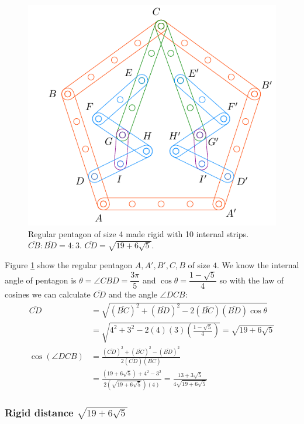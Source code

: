 \documentclass[11pt]{article}
\begin{document}
\begin{figure}[H]
\centering
\includegraphics[scale=1.1]{4/penta4-10a}
\caption{Regular pentagon of size 4 made rigid with 10 internal strips. $\overline{CB} : \overline{BD} = 4:3$. $\overline{CD} = \sqrt{19 + 6\sqrt5}$.}
\label{fig:penta4-10a}
\end{figure}

Figure \ref{fig:penta4-10a} show the regular pentagon $A,A',B',C,B$ of size $4$. We know the internal angle of pentagon is $\theta=\angle{CBD}=\dfrac{3\pi}5$ and $\cos\theta=\dfrac{1-\sqrt5}4$ so with the law of cosines we can calculate $\overline{CD}$ and the angle $\angle{DCB}$:
\begin{align}
\overline{CD} &= \sqrt{(\overline{BC})^2 + (\overline{BD})^2
 - 2(\overline{BC})(\overline{BD})\cos\theta} \nonumber\\
 &= \sqrt{4^2 + 3^2 - 2(4)(3)\left(\frac{1-\sqrt5}4\right)} = \sqrt{19+6\sqrt5}\\
%
\cos(\angle{DCB}) &= \frac{(\overline{CD})^2 + (\overline{BC})^2 - (\overline{BD})^2}
 {2(\overline{CD})(\overline{BC})} \nonumber\\
 &= \frac{(19+6\sqrt5) + 4^2 - 3^2}{2\left(\sqrt{19+6\sqrt5}\right)(4)}
  = \frac{13 + 3\sqrt5}{4\sqrt{19+6\sqrt5}}
\end{align}

\subsubsection{Rigid distance  $\sqrt{19+6\sqrt5}$}
\end{document}
